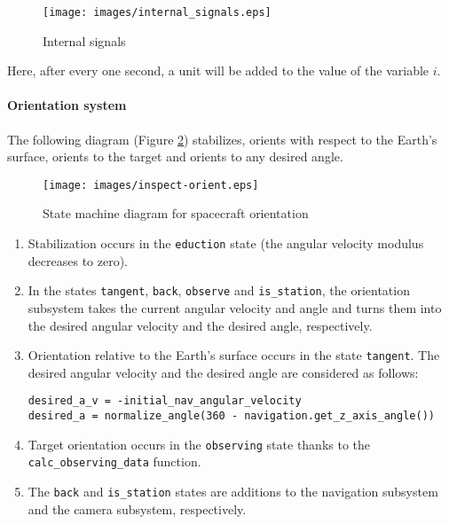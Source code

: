 \documentclass[12pt,a4paper]{article}
\begin{document}
\begin{figure}[tbh]
  \begin{center}
    \texttt{[image: images/internal\_signals.eps]}
    \caption{Internal signals}
    \label{Pic:IfElse}
  \end{center}
\end{figure}

Here, after every one second, a unit will be added to the value of the variable $i$.

\clearpage

\paragraph{Orientation system} The following diagram (Figure \ref{Pic:INSPECT-orient-en}) stabilizes, orients with respect to the Earth's surface, orients to the target and orients to any desired angle.

\begin{figure}[tbh]
  \begin{center}
    \texttt{[image: images/inspect-orient.eps]}
    \caption{State machine diagram for spacecraft orientation}
    \label{Pic:INSPECT-orient-en}
  \end{center}
\end{figure}

\begin{enumerate}
\item Stabilization occurs in the \verb'eduction' state (the angular velocity modulus decreases to zero).

\item In the states \verb'tangent', \verb'back', \verb'observe' and \verb'is_station', the orientation subsystem takes the current angular velocity and angle and turns them into the desired angular velocity and the desired angle, respectively.

\item Orientation relative to the Earth's surface occurs in the state \verb'tangent'. The desired angular velocity and the desired angle are considered as follows:
\begin{verbatim}
desired_a_v = -initial_nav_angular_velocity
desired_a = normalize_angle(360 - navigation.get_z_axis_angle())
\end{verbatim}
\item Target orientation occurs in the \verb'observing' state thanks to the \verb'calc_observing_data' function.
\item The \verb'back' and \verb'is_station' states are additions to the navigation subsystem and the camera subsystem, respectively.
\end{enumerate}
\end{document}
